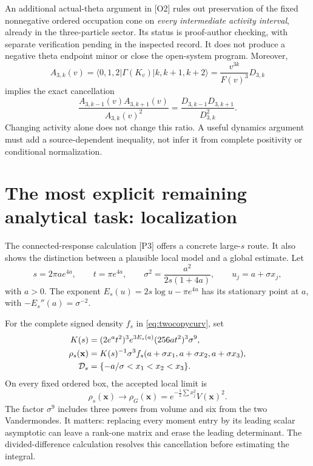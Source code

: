 \documentclass[11pt,letterpaper]{article}
\numberwithin{equation}{section}
\theoremstyle{remark}
\newcommand{\evid}[1]{\textsf{[#1]}}
\newcommand{\ket}[1]{\lvert #1\rangle}
\newcommand{\bra}[1]{\langle #1\rvert}
\begin{document}
An additional actual-theta argument in \evid{O2} rules out preservation
of the fixed nonnegative ordered occupation cone on \emph{every
intermediate activity interval}, already in the three-particle sector.
Its status is proof-author checking, with separate verification pending
in the inspected record. It does not produce a negative theta endpoint
minor or close the open-system program. Moreover,
\begin{equation}
 A_{3,k}(v)=\bra{0,1,2}\Gamma(K_v)\ket{k,k+1,k+2}
          =\frac{v^{3k}}{F(v)^3}D_{3,k}
\end{equation}
implies the exact cancellation
\begin{equation}
 \frac{A_{3,k-1}(v)A_{3,k+1}(v)}{A_{3,k}(v)^2}
 =\frac{D_{3,k-1}D_{3,k+1}}{D_{3,k}^2}. \label{eq:activity}
\end{equation}
Changing activity alone does not change this ratio. A useful dynamics
argument must add a source-dependent inequality, not infer it from
complete positivity or conditional normalization.

\section{The most explicit remaining analytical task: localization}
\label{sec:saddle}

The connected-response calculation \evid{P3} offers a concrete
large-$s$ route. It also shows the distinction between a plausible
local model and a global estimate. Let
\begin{equation}
 s=2\pi a e^{4a},\qquad t=\pi e^{4a},\qquad
 \sigma^2=\frac{a^2}{2s(1+4a)},\qquad u_j=a+\sigma x_j,
 \label{eq:scales}
\end{equation}
with $a>0$. The exponent $E_s(u)=2s\log u-\pi e^{4u}$ has its
stationary point at $a$, with $-E_s''(a)=\sigma^{-2}$.

For the complete signed density $f_s$ in \eqref{eq:twocopycurv}, set
\begin{align}
 K(s)&=(2e^at^2)^3e^{3E_s(a)}(256at^2)^3\sigma^9,\notag\\
 \rho_s(\mathbf x)&=K(s)^{-1}\sigma^3
             f_s(a+\sigma x_1,a+\sigma x_2,a+\sigma x_3),\notag\\
 \mathcal D_s&=\{-a/\sigma<x_1<x_2<x_3\}. \label{eq:rhos}
\end{align}
On every fixed ordered box, the accepted local limit is
\begin{equation}
 \rho_s(\mathbf x)\longrightarrow
 \rho_G(\mathbf x)=e^{-\frac12\sum x_j^2}V(\mathbf x)^2.
 \label{eq:local}
\end{equation}
The factor $\sigma^9$ includes three powers from volume and six from
the two Vandermondes. It matters: replacing every moment entry by its
leading scalar asymptotic can leave a rank-one matrix and erase the
leading determinant. The divided-difference calculation resolves this
cancellation before estimating the integral.
\end{document}
